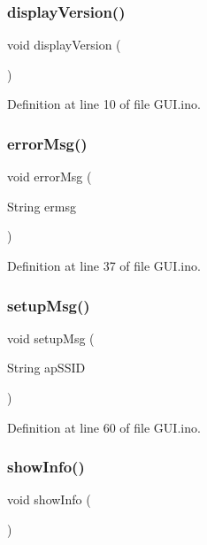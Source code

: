 \subsubsection{\texorpdfstring{displayVersion()}{displayVersion()}}
{\footnotesize\ttfamily void display\+Version (\begin{DoxyParamCaption}{ }\end{DoxyParamCaption})}



Definition at line 10 of file G\+U\+I.\+ino.

\mbox{\label{_g_u_i_8ino_a49c15add2b3fb1bab622467ffcf6584a}} 
\subsubsection{\texorpdfstring{errorMsg()}{errorMsg()}}
{\footnotesize\ttfamily void error\+Msg (\begin{DoxyParamCaption}\item[{String}]{ermsg }\end{DoxyParamCaption})}



Definition at line 37 of file G\+U\+I.\+ino.

\mbox{\label{_g_u_i_8ino_ae2698a607f6e5be64f909e7ef2b9a579}} 
\subsubsection{\texorpdfstring{setupMsg()}{setupMsg()}}
{\footnotesize\ttfamily void setup\+Msg (\begin{DoxyParamCaption}\item[{String}]{ap\+S\+S\+ID }\end{DoxyParamCaption})}



Definition at line 60 of file G\+U\+I.\+ino.

\mbox{\label{_g_u_i_8ino_a6da7bf7685a4f65561ec15045a11b993}} 
\subsubsection{\texorpdfstring{showInfo()}{showInfo()}}
{\footnotesize\ttfamily void show\+Info (\begin{DoxyParamCaption}{ }\end{DoxyParamCaption})}



